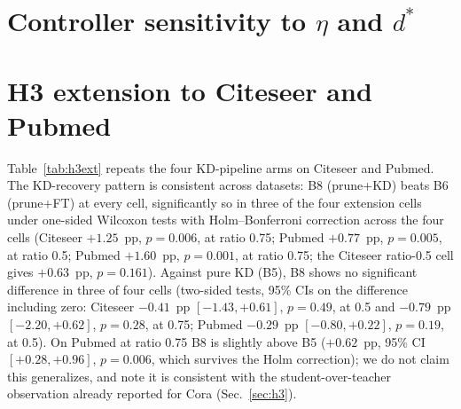\documentclass{ws-ijprai}
\begin{document}


\clearpage
\section{Controller sensitivity to $\eta$ and $d^*$}
\label{app:sens}



\clearpage
\section{H3 extension to Citeseer and Pubmed}
\label{app:h3ext}

Table~\ref{tab:h3ext} repeats the four KD-pipeline arms on Citeseer and
Pubmed. The KD-recovery pattern is consistent across datasets: B8 (prune+KD)
beats B6 (prune+FT) at every cell, significantly so in three of the four
extension cells under one-sided Wilcoxon tests with Holm--Bonferroni
correction across the four cells (Citeseer $+1.25$~pp, $p=0.006$, at ratio
0.75; Pubmed $+0.77$~pp, $p=0.005$, at ratio 0.5; Pubmed $+1.60$~pp,
$p=0.001$, at ratio 0.75; the Citeseer ratio-0.5 cell gives $+0.63$~pp,
$p=0.161$). Against pure KD (B5), B8 shows no significant difference in
three of four cells (two-sided tests, 95\% CIs on the difference including
zero: Citeseer $-0.41$~pp $[-1.43, +0.61]$, $p=0.49$, at 0.5 and $-0.79$~pp
$[-2.20, +0.62]$, $p=0.28$, at 0.75; Pubmed $-0.29$~pp $[-0.80, +0.22]$,
$p=0.19$, at 0.5). On Pubmed at ratio 0.75 B8 is slightly above B5
($+0.62$~pp, 95\% CI $[+0.28, +0.96]$, $p=0.006$, which survives the Holm
correction); we do not claim this generalizes, and note it is consistent with
the student-over-teacher observation already reported for Cora
(Sec.~\ref{sec:h3}).


\end{document}
